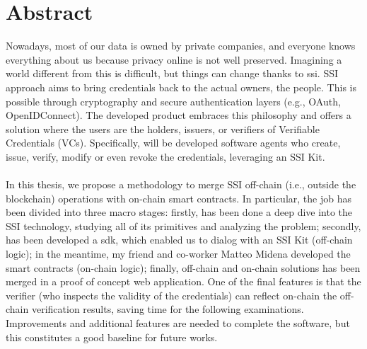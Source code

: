 
\cleardoublepage
{}
{}
\begingroup
\let\clearpage\relax
\let\cleardoublepage\relax
\let\cleardoublepage\relax

\chapter*{Abstract}

Nowadays, most of our data is owned by private companies, and everyone knows 
everything about us because privacy online is not well preserved. Imagining a 
world different from this is difficult, but things can change thanks to 
\acrfull{ssi}. SSI approach aims to bring credentials back to the 
actual owners, the people. This is possible through cryptography and secure 
authentication layers (e.g., OAuth, OpenIDConnect). The developed product embraces 
this philosophy and offers a solution where the users are the holders, issuers, or 
verifiers of Verifiable Credentials (VCs). Specifically, will be developed software 
agents who create, issue, verify, modify or even revoke the credentials, leveraging 
an SSI Kit.\\\\
In this thesis, we propose a methodology to merge SSI off-chain (i.e., outside the 
blockchain) operations with on-chain smart contracts. In particular, the job has been 
divided into three macro stages: firstly, has been done a deep dive into the SSI 
technology, studying all of its primitives and analyzing the problem; secondly, has 
been developed a \acrfull{sdk}, which enabled us to dialog with an 
SSI Kit (off-chain logic); in the meantime, my friend and co-worker Matteo Midena 
developed the smart contracts (on-chain logic); finally, off-chain and on-chain 
solutions has been merged in a proof of concept web application.
One of the final features is that the verifier (who inspects the validity of the 
credentials) can reflect on-chain the off-chain verification results, saving time 
for the following examinations. Improvements and additional features are needed to 
complete the software, but this constitutes a good baseline for future works.
\endgroup			

\vfill

